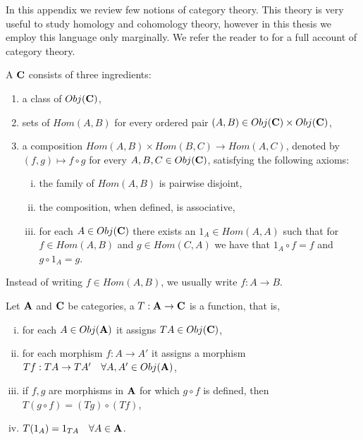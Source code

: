 \documentclass[../1.tex]{subfiles}
\begin{document}
    In this appendix we review few notions of category theory.
    This theory is very useful to study homology and cohomology theory, however in this thesis we employ this language only marginally.
    We refer the reader to \cite{mclane} for a full account of category theory.

    \begin{defn}
        A  $\textbf{C}$ consists of three ingredients:
        \begin{enumerate}[1.]
            \item a class of  $Obj(\textbf{C})$,
            \item sets of  $Hom(A,B)$ for every ordered pair $(A,B) \in Obj(\textbf{C}) \times Obj(\textbf{C})$,
            \item a composition $Hom(A,B) \times Hom(B,C) \to Hom(A,C)$, denoted by $(f,g) \mapsto f \circ g$ for every $A,B,C \in Obj(\textbf{C})$, satisfying the following axioms:
            \begin{enumerate}[(i)]
                \item the family of $Hom(A,B)$ is pairwise disjoint,
                \item the composition, when defined, is associative,
                \item for each $A \in Obj(\textbf{C})$ there exists an  $1_A \in Hom(A,A)$ such that for $f \in Hom(A,B)$ and $g \in Hom(C,A)$ we have that $1_A \circ f = f$ and $g \circ 1_A = g$.
            \end{enumerate}
        \end{enumerate}
    \end{defn}

    Instead of writing $f \in Hom(A,B)$, we usually write $f : A \to B$. 

    \begin{defn}
        Let $\textbf{A}$ and $\textbf{C}$ be categories, a  $T : \textbf{A} \to \textbf{C}$ is a function, that is, 
        \begin{enumerate}[(i)]
            \item for each $A \in Obj(\textbf{A})$ it assigns $TA \in Obj(\textbf{C})$,
            \item for each morphism $f:A \to A'$ it assigns a morphism $Tf: TA \to TA' \quad \forall A,A' \in Obj(\textbf{A})$,
            \item if $f,g$ are morphisms in $\textbf{A}$ for which $g \circ f$ is defined, then $T(g \circ f) = (Tg) \circ (Tf)$,
            \item $T(1_A)= 1_{TA} \quad \forall A \in \textbf{A}$.
        \end{enumerate}
    \end{defn}
\end{document}
